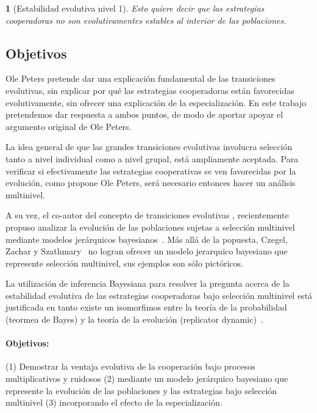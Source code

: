 \documentclass[a4paper,10pt]{article}
\newif\ifen
\newif\ifes
\newcommand{\en}[1]{\ifen#1\fi}
\newcommand{\es}[1]{\ifes#1\fi}
\newtheorem{conclution}{\en{Conclution}\es{Conclusión}}%
\begin{document}
\begin{conclution}[Estabilidad evolutiva nivel 1]
Esto quiere decir que las estrategias cooperadoras no son evolutivamentes estables al interior de las poblaciones.
\end{conclution}

\subsection{Objetivos}

Ole Peters pretende dar una explicación fundamental de las transiciones evolutivas, sin explicar por qué las estrategias cooperadoras están favorecidas evolutivamente, sin ofrecer una explicación de la especialización. 
En este trabajo pretendemos dar respuesta a ambos puntos, de modo de aportar apoyar el argumento original de Ole Peters.

La idea general de que las grandes transiciones evolutivas involucra selección tanto a nivel individual como a nivel grupal, está ampliamente aceptada.
Para verificar si efectivamente las estrategias cooperativas se ven favorecidas por la evolución, como propone Ole Peters, será necesario entonces hacer un análisis multinivel.

A su vez, el co-autor del concepto de transiciones evolutivas \cite{szathmary1995-evolutionaryTransitions, szathmary2015-evolutionaryTransitions}, recientemente propuso analizar la evolución de las poblaciones sujetas a selección multinivel mediante modelos jerárquicos bayesianos~\cite{czegel2019-bayesianEvolution}.
Más allá de la popuesta, Czegel, Zachar y Szathmary~\cite{czegel2019-bayesianEvolution} no logran ofrecer un modelo jerarquico bayesiano que represente selección multinivel, sus ejemplos son sólo pictóricos.

La utilización de inferencia Bayesiana para resolver la pregunta acerca de la estabilidad evolutiva de las estrategias cooperadoras bajo selección multinivel está justificada en tanto existe un isomorfimos entre la teoría de la probabilidad (teormea de Bayes) y la teoría de la evolución (replicator dynamic)~\cite{harper2009-replicatorAsInference,shalizi2009-replicatorAsInference}.

\paragraph{Objetivos:}
(1) Demostrar la ventaja evolutiva de la cooperación bajo procesos multiplicativos y ruidosos (2) mediante un modelo jerárquico bayesiano que represente la evolución de las poblaciones y las estrategias bajo selección multinivel (3) incorporando el efecto de la especialización.
\end{document}
